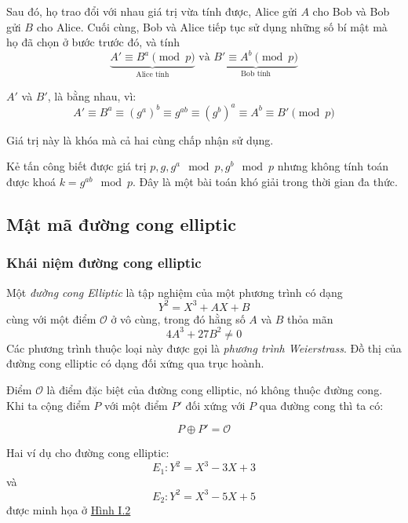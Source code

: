 Sau đó, họ trao đổi với nhau giá trị vừa tính được, Alice gửi $A$ cho Bob và Bob gửi $B$ cho Alice. 
Cuối cùng, Bob và Alice tiếp tục sử dụng những số bí mật mà họ đã chọn ở bước trước đó, và tính
$$\underbrace{A' \equiv B^a \pmod{p}}_{\text{Alice tính}} \text{ và } \underbrace{B' \equiv A^b \pmod{p}}_{\text{Bob tính}}$$

$A'$ và $B'$, là bằng nhau, vì:
$$A' \equiv B^a \equiv (g^a)^b \equiv g^{ab} \equiv (g^b)^a \equiv A^b \equiv B' \pmod{p}$$

Giá trị này là khóa mà cả hai cùng chấp nhận sử dụng.

Kẻ tấn công biết được giá trị $p,g,g^a \mod p, g^b \mod p $ nhưng không 
tính toán được khoá $k = g^{ab} \mod p$. Đây là một bài toán khó giải 
trong thời gian đa thức. \cite{elliptic}

\subsection{Mật mã đường cong elliptic}
\subsubsection{Khái niệm đường cong elliptic}

Một \textit{đường cong Elliptic} là tập nghiệm của một phương trình có dạng
$$Y^2 = X^3 + AX + B$$ cùng với một điểm $\mathcal{O}$ ở vô cùng, trong đó hằng số $A$ và $B$ thỏa mãn
$$ 4A^3 + 27B^2 \neq 0$$
Các phương trình thuộc loại này được gọi là \textit{phương trình Weierstrass}. 
Đồ thị của đường cong elliptic có dạng đối xứng qua trục hoành. \cite{elliptic}

Điểm $\mathcal{O}$ là điểm đặc biệt của đường cong elliptic, nó không thuộc đường cong.
Khi ta cộng điểm $P$ với một điểm $P'$ đối xứng với $P$ qua đường cong thì ta có:

$$ P \oplus P' = \mathcal{O}$$

Hai ví dụ cho đường cong elliptic:
$$ E_1: Y^2=X^3-3X+3 $$ và $$ E_2: Y^2=X^3-5X+5 $$ được minh họa ở \hyperref[fg:fg1]{Hình I.2}

